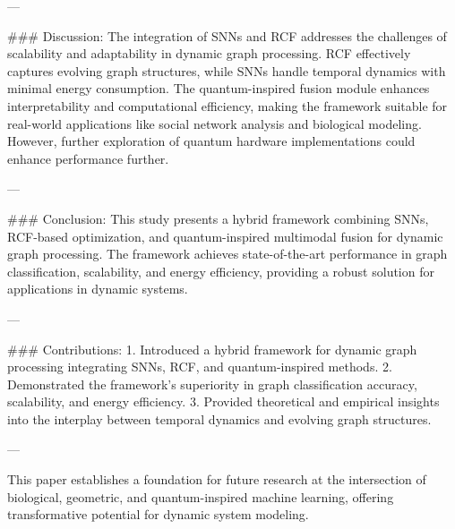 ---

### Discussion:
The integration of SNNs and RCF addresses the challenges of scalability and adaptability in dynamic graph processing. RCF effectively captures evolving graph structures, while SNNs handle temporal dynamics with minimal energy consumption. The quantum-inspired fusion module enhances interpretability and computational efficiency, making the framework suitable for real-world applications like social network analysis and biological modeling. However, further exploration of quantum hardware implementations could enhance performance further.

---

### Conclusion:
This study presents a hybrid framework combining SNNs, RCF-based optimization, and quantum-inspired multimodal fusion for dynamic graph processing. The framework achieves state-of-the-art performance in graph classification, scalability, and energy efficiency, providing a robust solution for applications in dynamic systems.

---

### Contributions:
1. Introduced a hybrid framework for dynamic graph processing integrating SNNs, RCF, and quantum-inspired methods.
2. Demonstrated the framework's superiority in graph classification accuracy, scalability, and energy efficiency.
3. Provided theoretical and empirical insights into the interplay between temporal dynamics and evolving graph structures.

---

This paper establishes a foundation for future research at the intersection of biological, geometric, and quantum-inspired machine learning, offering transformative potential for dynamic system modeling.